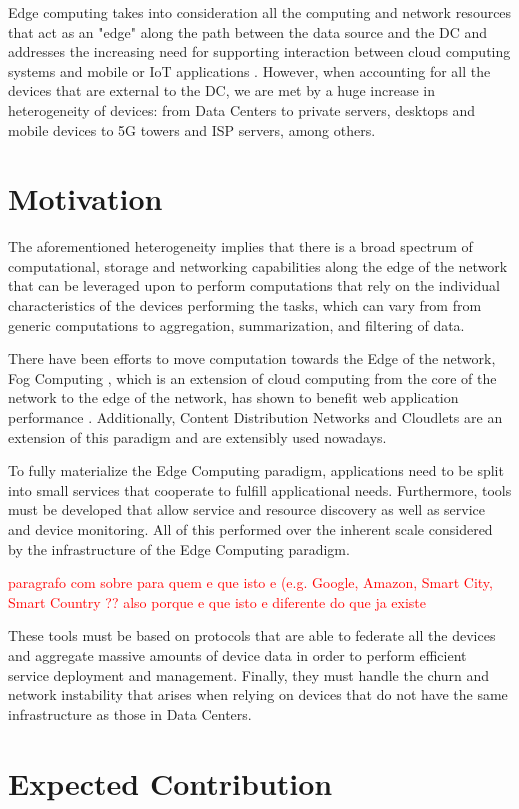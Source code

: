 Edge computing takes into consideration all the computing and network resources that act as an "edge" along the path between the data source and the DC and addresses the increasing need for supporting interaction between cloud computing systems and mobile or IoT applications \cite{iot_journal_shi_weisong_and_cao}. However, when accounting for all the devices that are external to the DC, we are met by a huge increase in heterogeneity of devices: from Data Centers to private servers, desktops and mobile devices to 5G towers and ISP servers, among others. 

\section{Motivation}

The aforementioned heterogeneity implies that there is a broad spectrum of
computational, storage and networking capabilities along the edge of the network that can be leveraged upon to perform computations that rely on the individual characteristics of the devices performing the tasks, which can vary from from generic computations to aggregation, summarization, and filtering of data. \cite{DBLP:journals/corr/abs-1805-06989} %


There have been efforts to move computation towards the Edge of the network, Fog Computing \cite{yi2015fog}, which is an extension of cloud computing from the core of the network to the edge of the network, has shown to benefit web application performance \cite{Improving_Web_Sites_Performance_Using_Edge_Servers_in_Fog_Computing_Architecture}. Additionally, Content Distribution Networks \cite{} and Cloudlets \cite{} 
are an extension of this paradigm and are extensibly used nowadays. %

To fully materialize the Edge Computing paradigm, applications need to be split into small services that cooperate to fulfill applicational needs. 
Furthermore, tools must be developed that allow service and resource discovery as well as service and device monitoring. All of this performed over the inherent scale considered by the infrastructure of the Edge Computing paradigm.

\textcolor{red}{paragrafo com sobre para quem e que isto e (e.g. Google, Amazon, Smart City, Smart Country ?? also porque e que isto e diferente do que ja existe}

These tools must be based on protocols that are able to federate all the devices and aggregate massive amounts of device data in order to perform efficient service deployment and management. Finally, they must handle the churn and network instability that arises when relying on devices that do not have the same infrastructure as those in Data Centers.

\section{Expected Contribution}
